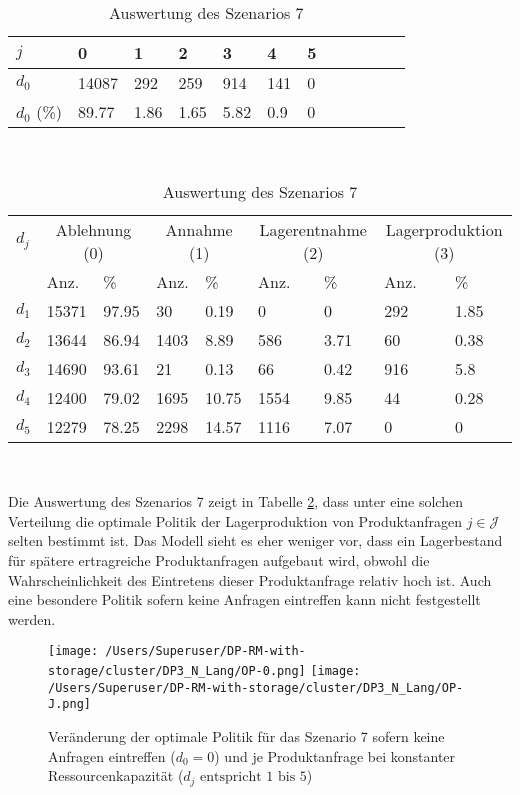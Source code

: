 \begin{table}[h!]
\renewcommand{\arraystretch}{1.5}
  \begin{center}
    \caption{Auswertung des Szenarios 7}  \label{AS7}
    \vspace*{3mm}
    \begin{tabular}{l l l l l l l l l l l l }  \hline 
         $j$ & 0 & 1  & 2 & 3 & 4  & 5   \\  \hline
$d_{0}$ &  14087 &   292 &   259 &   914 &  141 &  0 \\
$d_{0}$ (\%) &  89.77 &  1.86 &  1.65 &  5.82 &  0.9 &  0 \\
\hline
    \end{tabular} \\[3mm]
        \begin{tabular}{ l l l l l l l l l}   \hline    %
    $d_j$ & \multicolumn{2}{c}{Ablehnung (0)} & \multicolumn{2}{c}{Annahme (1)}  & \multicolumn{2}{c}{Lagerentnahme (2)} & \multicolumn{2}{c}{Lagerproduktion (3)}\\
    & Anz. & \% & Anz. & \% & Anz. & \% & Anz. & \% \\ \hline 
$d_{1}$ &  15371 &  97.95 &    30 &   0.19 &   0 &   0 &  292 &  1.85 \\
$d_{2}$ &  13644 &  86.94 &  1403 &   8.89 &   586 &  3.71 &   60 &  0.38 \\
$d_{3}$ &  14690 &  93.61 &    21 &   0.13 &    66 &  0.42 &  916 &   5.8 \\
$d_{4}$ &  12400 &  79.02 &  1695 &  10.75 &  1554 &  9.85 &   44 &  0.28 \\
$d_{5}$ &  12279 &  78.25 &  2298 &  14.57 &  1116 &  7.07 &  0 &   0 \\
          \hline
   \end{tabular} \\[3mm]
     \end{center}
\end{table}

Die Auswertung des Szenarios 7 zeigt in Tabelle \ref{AS7}, dass unter eine solchen Verteilung die optimale Politik der Lagerproduktion von Produktanfragen $j\in\mathcal{J}$ selten bestimmt ist. Das Modell sieht es eher weniger vor, dass ein Lagerbestand für spätere ertragreiche Produktanfragen aufgebaut wird, obwohl die Wahrscheinlichkeit des Eintretens dieser Produktanfrage relativ hoch ist. Auch eine besondere Politik sofern keine Anfragen eintreffen kann nicht festgestellt werden.

\begin{figure}[h!]     
\begin{center}
\texttt{[image: /Users/Superuser/DP-RM-with-storage/cluster/DP3\_N\_Lang/OP-0.png]}
\texttt{[image: /Users/Superuser/DP-RM-with-storage/cluster/DP3\_N\_Lang/OP-J.png]}
    \caption{Veränderung der optimale Politik für das Szenario 7 sofern keine Anfragen eintreffen ($d_0=0$) und je Produktanfrage bei konstanter Ressourcenkapazität ($d_j\text{ entspricht }1\text{ bis }5$)}  \label{SV7}
  \end{center}
\end{figure}

